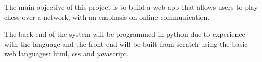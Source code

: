 The main objective of this project is to build a web app that allows users to play chess over a network, with an emphasis on online communication.

The back end of the system will be programmed in python due to experience with the language and the front end will be built from scratch using the basic web languages: html, css and javascript.